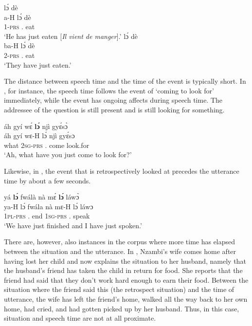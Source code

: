 \ea\label{lo1}
\ea\label{lo1a}
   lɔ́ dè \\
           a-H lɔ́ dè \\
            1-\textsc{prs} {\RETRO}.{\R} eat\\
    \trans `He has just eaten [{\itshape Il vient de manger}].'
\ex\label{lo1b}
   lɔ́ dè \\
         ba-H lɔ́ dè \\
             2-\textsc{prs} {\RETRO}.{\R} eat\\
    \trans `They have just eaten.'
\z
\z



The distance between speech time and the time of the event is typically short. In , for instance, the speech time follows the event of `coming to look for' immediately, while the event has ongoing affects during speech time. The addressee of the question is still present and is still looking for something.

\ea\label{lo2}
  \glll  áh gyí wɛ́ {\bfseries lɔ́} njì gyɛ́sɔ̀ \\
          áh gyí wɛ-H lɔ́ njì gyɛ́sɔ \\
           {\EXCL} what 2\textsc{sg}-\textsc{prs} {\RETRO}.{\R} come look.for\\
    \trans `Ah, what have you just come to look for?'
\z

Likewise, in , the event that is retrospectively looked at precedes the utterance time by about a few seconds. 

\ea\label{lo3}
  \glll     yá {\bfseries lɔ́} fwálà nà mɛ́ {\bfseries lɔ́} láwɔ̀ \\
            ya-H lɔ́ fwála nà mɛ-H lɔ́ láwɔ \\
              1\textsc{pl}-\textsc{prs} {\RETRO}.{\R} end {\COM} 1\textsc{sg}-\textsc{prs} {\RETRO}.{\R} speak\\
    \trans `We have just finished and I have just spoken.'
\z

There are, however, also instances in the corpus where more time has elapsed between the situation and the utterance. In , Nzambi's wife comes home after having lost her child and now explains the situation to her husband, namely that the husband's friend has taken the child in return for food. She reports that the friend had said that they don't work hard enough to earn their food. Between the situation where the friend said this (the retrospect situation) and the time of utterance, the wife has left the friend's home, walked all the way back to her own home, had cried, and had gotten picked up by her husband. Thus, in this case, situation and speech time are not at all proximate.


